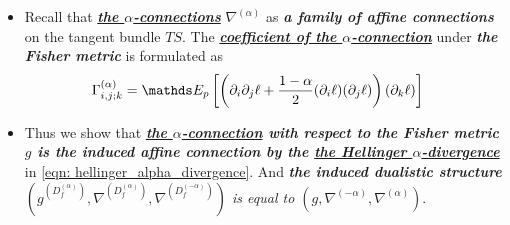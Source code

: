 \documentclass[11pt]{article}
\begin{document}
\begin{itemize}
\item Recall that  \underline{\emph{\textbf{the $\alpha$-connections}}} \citep{amari2007methods} $\nabla^{(\alpha)}$ as \emph{\textbf{a family of affine connections}} on the tangent bundle $TS$. The \emph{\underline{\textbf{coefficient of the $\alpha$-connection}}} under \emph{\textbf{the Fisher metric}} is formulated as
\begin{align}
\Gamma_{i,j; k}^{(\alpha)} &= \E{p}{\paren{ \partial_i \partial_j \ell + \frac{1 - \alpha}{2} (\partial_i \ell) (\partial_j \ell)}\paren{\partial_k \ell}} \label{eqn: alpha_connection_coefficient} 
\end{align} 

\item \begin{remark}
Thus we show that \emph{\textbf{\underline{the $\alpha$-connection} with respect to the Fisher metric $g$ is the induced affine connection by the \underline{the Hellinger $\alpha$-divergence}}} in  \eqref{eqn: hellinger_alpha_divergence}. And  \emph{\textbf{the induced dualistic structure} $(g^{(D_f^{(\alpha)})}, \nabla^{(D_f^{(\alpha)})}, \nabla^{(D_f^{(-\alpha)})})$  is equal to  $(g, \nabla^{(-\alpha)}, \nabla^{(\alpha)})$}. 
\end{remark}
\end{itemize}
\end{document}
